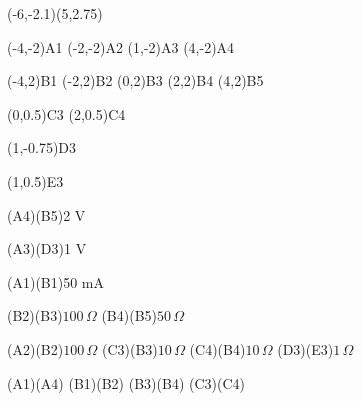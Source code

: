\pspicture*(-6,-2.1)(5,2.75)


\pnode(-4,-2){A1}
\pnode(-2,-2){A2}
\pnode(1,-2){A3}
\pnode(4,-2){A4}

\pnode(-4,2){B1}
\pnode(-2,2){B2}
\pnode(0,2){B3}
\pnode(2,2){B4}
\pnode(4,2){B5}

\pnode(0,0.5){C3}
\pnode(2,0.5){C4}

\pnode(1,-0.75){D3}

\pnode(1,0.5){E3}

\Ucc[labelInside=2,
intensity,
intensitylabel=$I$,
intensitylabeloffset=3mm,
arrowscale=2 2,
labeloffset=9mm](A4)(B5){2 V}

\Ucc[labelInside=2,labeloffset=9mm](A3)(D3){1 V}

\Ucc[labelInside=1,labeloffset=11mm,arrowscale=1.5 1.5,arrowinset=0](A1)(B1){50 mA}

\resistor[labeloffset=5mm](B2)(B3){$100\,\Omega$}
\resistor[labeloffset=5mm](B4)(B5){$50\,\Omega$}

\resistor[labeloffset=8mm](A2)(B2){$100\,\Omega$}
\resistor[labeloffset=7mm](C3)(B3){$10\,\Omega$}
\resistor[labeloffset=7mm](C4)(B4){$10\,\Omega$}
\resistor[labeloffset=6mm](D3)(E3){$1\,\Omega$}


\wire(A1)(A4)
\wire(B1)(B2)
\wire(B3)(B4)
\wire(C3)(C4)


\endpspicture